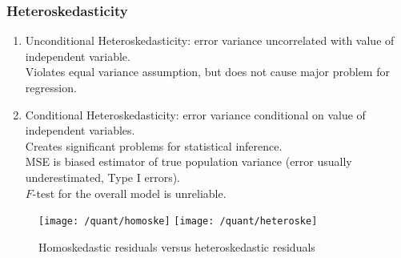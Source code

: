 \subsubsection{Heteroskedasticity}

\begin{remark} 
\begin{enumerate}[label=\roman*.]
\setlength{\itemsep}{0pt}
\item Unconditional Heteroskedasticity: error variance uncorrelated with value of independent variable.\\
Violates equal variance assumption, but does not cause major problem for regression.
\item Conditional Heteroskedasticity: error variance conditional on value of independent variables.\\
Creates significant problems for statistical inference.\\
MSE is biased estimator of true population variance (error usually underestimated, Type I errors).\\
$F$-test for the overall model is unreliable.
\end{enumerate}
\end{remark}

\begin{figure}[H]
\centering
\texttt{[image: /quant/homoske]}
\texttt{[image: /quant/heteroske]}
\caption{Homoskedastic residuals versus heteroskedastic residuals}
\end{figure}

